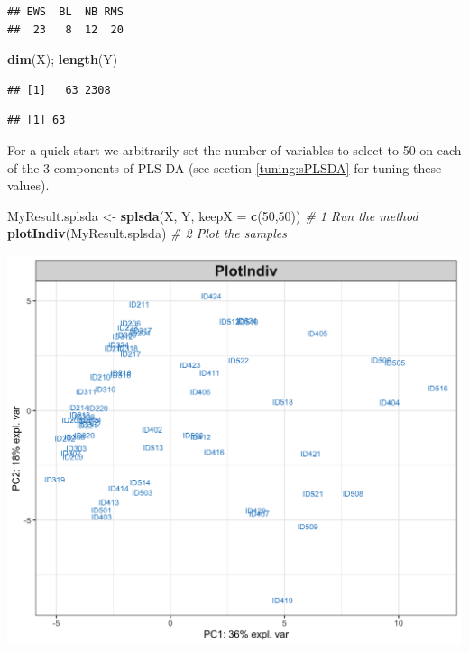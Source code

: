 \documentclass[]{book}
\newenvironment{Shaded}{\begin{snugshade}}{\end{snugshade}}
\newcommand{\KeywordTok}[1]{\textcolor[rgb]{0.13,0.29,0.53}{\textbf{#1}}}
\newcommand{\DataTypeTok}[1]{\textcolor[rgb]{0.13,0.29,0.53}{#1}}
\newcommand{\DecValTok}[1]{\textcolor[rgb]{0.00,0.00,0.81}{#1}}
\newcommand{\StringTok}[1]{\textcolor[rgb]{0.31,0.60,0.02}{#1}}
\newcommand{\CommentTok}[1]{\textcolor[rgb]{0.56,0.35,0.01}{\textit{#1}}}
\newcommand{\OperatorTok}[1]{\textcolor[rgb]{0.81,0.36,0.00}{\textbf{#1}}}
\newcommand{\NormalTok}[1]{#1}
\theoremstyle{definition}
\theoremstyle{definition}
\theoremstyle{definition}
\theoremstyle{remark}
\begin{document}
\begin{Shaded}
\end{Shaded}

\begin{verbatim}
## EWS  BL  NB RMS 
##  23   8  12  20
\end{verbatim}

\begin{Shaded}
\begin{Highlighting}[]
\KeywordTok{dim}\NormalTok{(X); }\KeywordTok{length}\NormalTok{(Y)}
\end{Highlighting}
\end{Shaded}

\begin{verbatim}
## [1]   63 2308
\end{verbatim}

\begin{verbatim}
## [1] 63
\end{verbatim}

For a quick start we arbitrarily set the number of variables to select
to 50 on each of the 3 components of PLS-DA (see section
\ref{tuning:sPLSDA} for tuning these values).

\begin{Shaded}
\begin{Highlighting}[]
\NormalTok{MyResult.splsda <-}\StringTok{ }\KeywordTok{splsda}\NormalTok{(X, Y, }\DataTypeTok{keepX =} \KeywordTok{c}\NormalTok{(}\DecValTok{50}\NormalTok{,}\DecValTok{50}\NormalTok{)) }\CommentTok{# 1 Run the method}
\KeywordTok{plotIndiv}\NormalTok{(MyResult.splsda)                          }\CommentTok{# 2 Plot the samples}
\end{Highlighting}
\end{Shaded}

\begin{center}\includegraphics[width=0.5\linewidth]{Figures/unnamed-chunk-2-1} \end{center}
\end{document}
